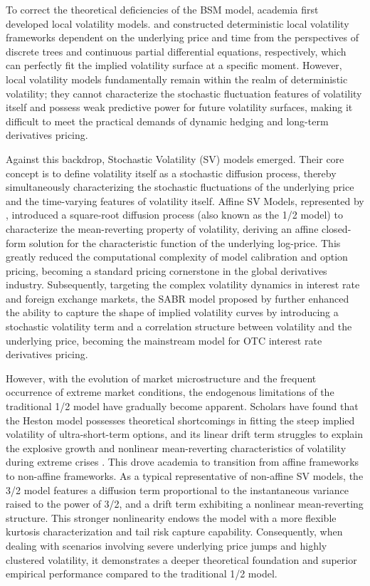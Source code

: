 To correct the theoretical deficiencies of the BSM model, academia first developed local volatility models. \citet{dermanRidingSmile1994} and \citet{Dupire1994} constructed deterministic local volatility frameworks dependent on the underlying price and time from the perspectives of discrete trees and continuous partial differential equations, respectively, which can perfectly fit the implied volatility surface at a specific moment. However, local volatility models fundamentally remain within the realm of deterministic volatility; they cannot characterize the stochastic fluctuation features of volatility itself and possess weak predictive power for future volatility surfaces, making it difficult to meet the practical demands of dynamic hedging and long-term derivatives pricing.

Against this backdrop, Stochastic Volatility (SV) models emerged. Their core concept is to define volatility itself as a stochastic diffusion process, thereby simultaneously characterizing the stochastic fluctuations of the underlying price and the time-varying features of volatility itself. Affine SV Models, represented by \citet{hestonSimpleNewFormula1997}, introduced a square-root diffusion process (also known as the 1/2 model) to characterize the mean-reverting property of volatility, deriving an affine closed-form solution for the characteristic function of the underlying log-price. This greatly reduced the computational complexity of model calibration and option pricing, becoming a standard pricing cornerstone in the global derivatives industry. Subsequently, targeting the complex volatility dynamics in interest rate and foreign exchange markets, the SABR model proposed by \citet{Hagan2002} further enhanced the ability to capture the shape of implied volatility curves by introducing a stochastic volatility term and a correlation structure between volatility and the underlying price, becoming the mainstream model for OTC interest rate derivatives pricing.

However, with the evolution of market microstructure and the frequent occurrence of extreme market conditions, the endogenous limitations of the traditional 1/2 model have gradually become apparent. Scholars have found that the Heston model possesses theoretical shortcomings in fitting the steep implied volatility of ultra-short-term options, and its linear drift term struggles to explain the explosive growth and nonlinear mean-reverting characteristics of volatility during extreme crises \citep{jonesDynamicsStochasticVolatility2003}. This drove academia to transition from affine frameworks to non-affine frameworks. As a typical representative of non-affine SV models, the 3/2 model features a diffusion term proportional to the instantaneous variance raised to the power of 3/2, and a drift term exhibiting a nonlinear mean-reverting structure. This stronger nonlinearity endows the model with a more flexible kurtosis characterization and tail risk capture capability. Consequently, when dealing with scenarios involving severe underlying price jumps and highly clustered volatility, it demonstrates a deeper theoretical foundation and superior empirical performance compared to the traditional 1/2 model.

